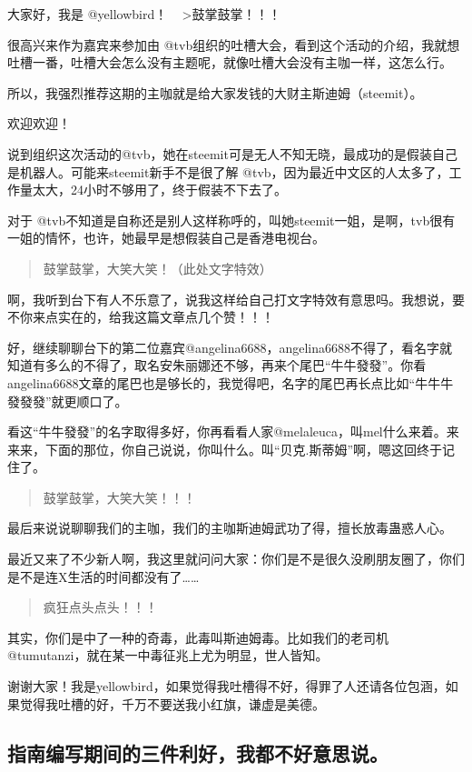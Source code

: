 \documentclass[]{ctexbook}
\begin{document}
大家好，我是 @yellowbird！
~
\textgreater{}鼓掌鼓掌！！！

很高兴来作为嘉宾来参加由 @tvb组织的吐槽大会，看到这个活动的介绍，我就想吐槽一番，吐槽大会怎么没有主题呢，就像吐槽大会没有主咖一样，这怎么行。

所以，我强烈推荐这期的主咖就是给大家发钱的大财主斯迪姆（steemit）。

欢迎欢迎！

说到组织这次活动的@tvb，她在steemit可是无人不知无晓，最成功的是假装自己是机器人。可能来steemit新手不是很了解 @tvb，因为最近中文区的人太多了，工作量太大，24小时不够用了，终于假装不下去了。

对于 @tvb不知道是自称还是别人这样称呼的，叫她steemit一姐，是啊，tvb很有一姐的情怀，也许，她最早是想假装自己是香港电视台。

\begin{quote}
鼓掌鼓掌，大笑大笑！（此处文字特效）
\end{quote}

啊，我听到台下有人不乐意了，说我这样给自己打文字特效有意思吗。我想说，要不你来点实在的，给我这篇文章点几个赞！！！

好，继续聊聊台下的第二位嘉宾@angelina6688，angelina6688不得了，看名字就知道有多么的不得了，取名安朱丽娜还不够，再来个尾巴``牛牛發發''。你看angelina6688文章的尾巴也是够长的，我觉得吧，名字的尾巴再长点比如``牛牛牛發發發''就更顺口了。

看这``牛牛發發''的名字取得多好，你再看看人家@melaleuca，叫mel什么来着。来来来，下面的那位，你自己说说，你叫什么。叫``贝克.斯蒂姆''啊，嗯这回终于记住了。

\begin{quote}
鼓掌鼓掌，大笑大笑！！！
\end{quote}

最后来说说聊聊我们的主咖，我们的主咖斯迪姆武功了得，擅长放毒蛊惑人心。

最近又来了不少新人啊，我这里就问问大家：你们是不是很久没刷朋友圈了，你们是不是连X生活的时间都没有了\ldots{}\ldots{}

\begin{quote}
疯狂点头点头！！！
\end{quote}

其实，你们是中了一种的奇毒，此毒叫斯迪姆毒。比如我们的老司机@tumutanzi，就在某一中毒征兆上尤为明显，世人皆知。

谢谢大家！我是yellowbird，如果觉得我吐槽得不好，得罪了人还请各位包涵，如果觉得我吐槽的好，千万不要送我小红旗，谦虚是美德。

\subsection{指南编写期间的三件利好，我都不好意思说。}
\end{document}
